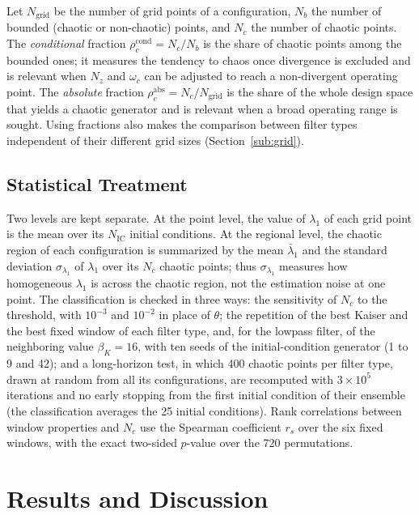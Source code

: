 \documentclass[journal]{IEEEtran}
\begin{document}
Let $N_{\text{grid}}$ be the number of grid points of a configuration, $N_b$
the number of bounded (chaotic or non-chaotic) points, and $N_c$ the number of
chaotic points. The \emph{conditional} fraction
$\rho_c^{\text{cond}}=N_c/N_b$ is the share of chaotic points among the bounded
ones; it measures the tendency to chaos once divergence is excluded and is
relevant when $N_z$ and $\omega_c$ can be adjusted to reach a non-divergent
operating point. The \emph{absolute} fraction
$\rho_c^{\text{abs}}=N_c/N_{\text{grid}}$ is the share of the whole design
space that yields a chaotic generator and is relevant when a broad operating
range is sought. Using fractions also makes the comparison between filter
types independent of their different grid sizes (Section~\ref{sub:grid}).

\subsection{Statistical Treatment}\label{sub:stats}
Two levels are kept separate. At the point level, the value of $\lambda_1$ of
each grid point is the mean over its $N_\text{IC}$ initial conditions. At the
regional level, the chaotic region of each configuration is summarized by the
mean $\bar{\lambda}_1$ and the standard deviation $\sigma_{\lambda_1}$ of
$\lambda_1$ over its $N_c$ chaotic points; thus $\sigma_{\lambda_1}$ measures
how homogeneous $\lambda_1$ is across the chaotic region, not the estimation
noise at one point. The classification is checked in three ways: the
sensitivity of $N_c$ to the threshold, with $10^{-3}$ and $10^{-2}$ in place of
$\theta$; the repetition of the best Kaiser and the best fixed window of each
filter type, and, for the lowpass filter, of the neighboring value
$\beta_K=16$, with ten seeds of the initial-condition generator (1 to 9 and 42);
and a long-horizon test, in which 400 chaotic points per filter type, drawn at
random from all its configurations, are recomputed with $3\times10^5$
iterations and no early stopping from
the first initial condition of their ensemble (the classification averages the
25 initial conditions). Rank correlations between window
properties and $N_c$ use the Spearman coefficient $r_s$ over the six fixed
windows, with the exact two-sided $p$-value over the 720 permutations.

\section{Results and Discussion}\label{sec:results}
\end{document}
